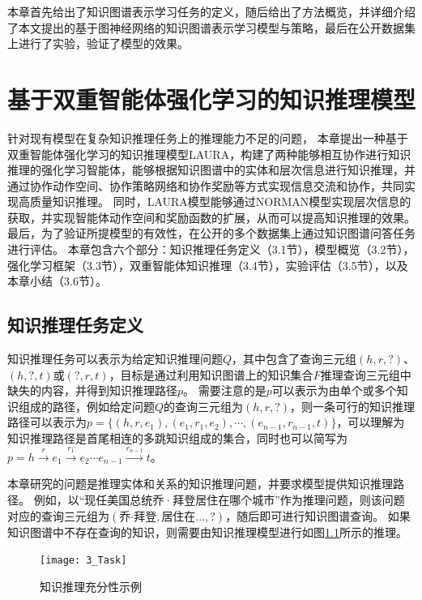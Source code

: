 \documentclass[algorithmlist, AutoFakeBold, AutoFakeSlant, figurelist, tablelist, nomlist, engineering, openany]{seuthesix} %
\begin{document}
本章首先给出了知识图谱表示学习任务的定义，随后给出了方法概览，并详细介绍了本文提出的基于图神经网络的知识图谱表示学习模型与策略，最后在公开数据集上进行了实验，验证了模型的效果。


\chapter{基于双重智能体强化学习的知识推理模型}
针对现有模型在复杂知识推理任务上的推理能力不足的问题，
本章提出一种基于双重智能体强化学习的知识推理模型LAURA，构建了两种能够相互协作进行知识推理的强化学习智能体，能够根据知识图谱中的实体和层次信息进行知识推理，并通过协作动作空间、协作策略网络和协作奖励等方式实现信息交流和协作，共同实现高质量知识推理。
同时，LAURA模型能够通过NORMAN模型实现层次信息的获取，并实现智能体动作空间和奖励函数的扩展，从而可以提高知识推理的效果。
最后，为了验证所提模型的有效性，在公开的多个数据集上通过知识图谱问答任务进行评估。
本章包含六个部分：知识推理任务定义（3.1节），模型概览（3.2节），强化学习框架（3.3节），双重智能体知识推理（3.4节），实验评估（3.5节），以及本章小结（3.6节）。

\section{知识推理任务定义}
知识推理任务可以表示为给定知识推理问题$Q$，其中包含了查询三元组$(h, r, ?)$、$(h, ?, t)$或$(?, r, t)$，目标是通过利用知识图谱上的知识集合$F$推理查询三元组中缺失的内容，并得到知识推理路径$p$。
需要注意的是$p$可以表示为由单个或多个知识组成的路径，例如给定问题$Q$的查询三元组为$(h, r, ?)$，则一条可行的知识推理路径可以表示为$p=\{(h, r, e_1), (e_1, r_1, e_2), \cdots, (e_{n-1}, r_{n-1}, t)\}$，可以理解为知识推理路径是首尾相连的多跳知识组成的集合，同时也可以简写为$p=h\xrightarrow{r}e_1\xrightarrow{r_1}e_2 \cdots e_{n-1}\xrightarrow{r_{n-1}}t$。

本章研究的问题是推理实体和关系的知识推理问题，并要求模型提供知识推理路径。
例如，以“现任美国总统乔·拜登居住在哪个城市”作为推理问题，则该问题对应的查询三元组为$(\mbox{乔·拜登}, \mbox{居住在...}, ?)$，随后即可进行知识图谱查询。
如果知识图谱中不存在查询的知识，则需要由知识推理模型进行如图\ref{3_Task}所示的推理。
\begin{figure}[ht]
  \centering
  \texttt{[image: 3\_Task]}
  \caption{知识推理充分性示例}
  \label{3_Task}
\end{figure}
\end{document}
